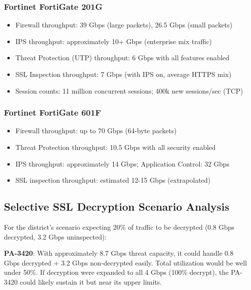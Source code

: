 \documentclass[12pt]{article}
\begin{document}
\subsubsection{Fortinet FortiGate 201G}
\begin{itemize}
    \item Firewall throughput: 39 Gbps (large packets), 26.5 Gbps (small packets) \cite{fortigate201gspec}
    \item IPS throughput: approximately 10+ Gbps (enterprise mix traffic)
    \item Threat Protection (UTP) throughput: 6 Gbps with all features enabled \cite{fortigate201gspec}
    \item SSL Inspection throughput: 7 Gbps (with IPS on, average HTTPS mix) \cite{fortigate201g}
    \item Session counts: 11 million concurrent sessions; 400k new sessions/sec (TCP) \cite{fortigate201g}
\end{itemize}

\subsubsection{Fortinet FortiGate 601F}
\begin{itemize}
    \item Firewall throughput: up to 70 Gbps (64-byte packets) \cite{fortigate601f}
    \item Threat Protection throughput: 10.5 Gbps with all security enabled \cite{fortigate601f}
    \item IPS throughput: approximately 14 Gbps; Application Control: 32 Gbps \cite{fortigate600fseries}
    \item SSL inspection throughput: estimated 12-15 Gbps (extrapolated)
\end{itemize}

\subsection{Selective SSL Decryption Scenario Analysis}

For the district's scenario expecting 20\% of traffic to be decrypted (0.8 Gbps decrypted, 3.2 Gbps uninspected):

\textbf{PA-3420}: With approximately 8.7 Gbps threat capacity, it could handle 0.8 Gbps decrypted + 3.2 Gbps non-decrypted easily. Total utilization would be well under 50\%. If decryption were expanded to all 4 Gbps (100\% decrypt), the PA-3420 could likely sustain it but near its upper limits.
\end{document}
